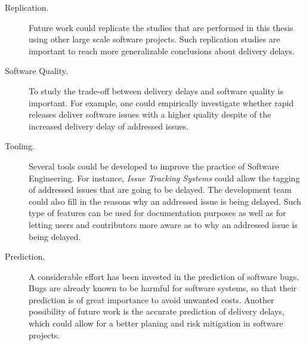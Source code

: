 \begin{description}
		
	\item[Replication.] Future work could replicate the studies that are
		performed in this thesis using other large scale software
		projects. Such replication studies are important to reach more
		generalizable conclusions about delivery delays.

	\item[Software Quality.] To study the trade-off between delivery delays
		and software quality is important. For example, one could
		empirically investigate whether rapid releases deliver software
		issues with a higher quality despite of the increased delivery
		delay of addressed issues.

	\item[Tooling.] Several tools could be developed to improve the practice
		of Software Engineering. For instance, {\em Issue Tracking
		Systems} could allow the tagging of addressed issues that are
		going to be delayed. The development team could also fill in the
		reasons why an addressed issue is being delayed. Such type of
		features can be used for documentation purposes as well as for
		letting users and contributors more aware as to why an addressed
		issue is being delayed.

	\item[Prediction.] A considerable effort has been invested in the
		prediction of software bugs. Bugs are already known to be
		harmful for software systems, so that their prediction is of
		great importance to avoid unwanted costs. Another possibility of
		future work is the accurate prediction of delivery delays, which
		could allow for a better planing and risk mitigation in software
		projects.

\end{description}

